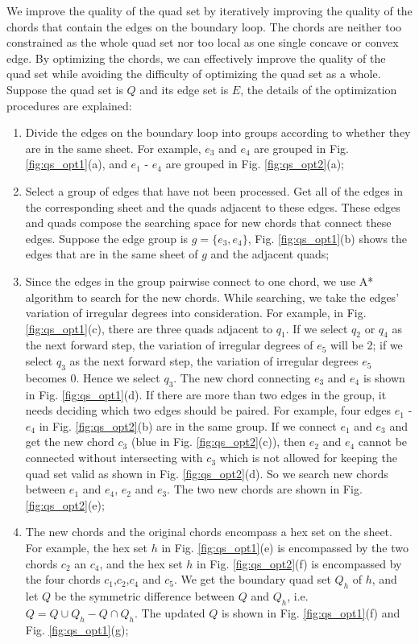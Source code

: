 \documentclass[final,5p,times,twocolumn]{elsarticle}
\begin{document}
We improve the quality of the quad set by iteratively improving the quality of the chords that contain the edges on the boundary loop. The chords are neither too constrained as the whole quad set nor too local as one single concave or convex edge. By optimizing the chords, we can effectively improve the quality of the quad set while avoiding the difficulty of optimizing the quad set as a whole. Suppose the quad set is $Q$ and its edge set is $E$, the details of the optimization procedures are explained:

\begin{enumerate}
  \item Divide the edges on the boundary loop into groups according to whether they are in the same sheet. For example, $e_3$ and $e_4$ are grouped in Fig. \ref{fig:qs_opt1}(a), and $e_1$ - $e_4$ are grouped in Fig. \ref{fig:qs_opt2}(a);
  \item Select a group of edges that have not been processed. Get all of the edges in the corresponding sheet and the quads adjacent to these edges. These edges and quads compose the searching space for new chords that connect these edges. Suppose the edge group is $g=\{e_3,e_4\}$, Fig. \ref{fig:qs_opt1}(b) shows the edges that are in the same sheet of $g$ and the adjacent quads;
  \item Since the edges in the group pairwise connect to one chord, we use A* algorithm to search for the new chords. While searching, we take the edges' variation of irregular degrees into consideration. For example, in Fig. \ref{fig:qs_opt1}(c), there are three quads adjacent to $q_1$. If we select $q_2$ or $q_4$ as the next forward step, the variation of irregular degrees of $e_5$ will be 2; if we select $q_3$ as the next forward step, the variation of irregular degrees $e_5$ becomes 0. Hence we select $q_3$. The new chord connecting $e_3$ and $e_4$ is shown in Fig. \ref{fig:qs_opt1}(d). If there are more than two edges in the group, it needs deciding which two edges should be paired. For example, four edges $e_1$ - $e_4$ in Fig. \ref{fig:qs_opt2}(b) are in the same group. If we connect $e_1$ and $e_3$ and get the new chord $c_3$ (blue in Fig. \ref{fig:qs_opt2}(c)), then $e_2$ and $e_4$ cannot be connected without intersecting with $c_3$ which is not allowed for keeping the quad set valid as shown in Fig. \ref{fig:qs_opt2}(d). So we search new chords between $e_1$ and $e_4$, $e_2$ and $e_3$. The two new chords are shown in Fig. \ref{fig:qs_opt2}(e);
  \item The new chords and the original chords encompass a hex set on the sheet. For example, the hex set $h$ in Fig. \ref{fig:qs_opt1}(e) is encompassed by the two chords $c_2$ an $c_4$, and the hex set $h$ in Fig. \ref{fig:qs_opt2}(f) is encompassed by the four chords $c_1$,$c_2$,$c_4$ and $c_5$. We get the boundary quad set $Q_h$ of $h$, and let $Q$ be the symmetric difference between $Q$ and $Q_h$, i.e. $Q=Q\cup Q_h-Q\cap Q_h$. The updated $Q$ is shown in Fig. \ref{fig:qs_opt1}(f) and Fig. \ref{fig:qs_opt1}(g);

\end{enumerate}
\end{document}
